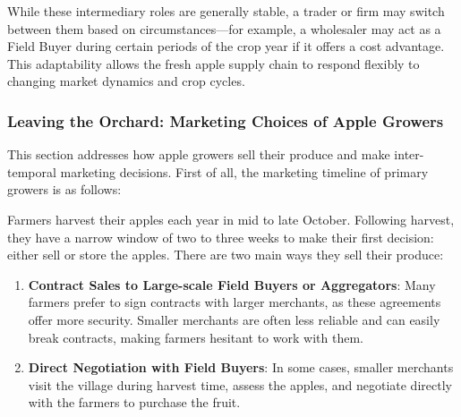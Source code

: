 While these intermediary roles are generally stable, a trader or firm may switch between them based on circumstances---for example, a wholesaler may act as a Field Buyer during certain periods of the crop year if it offers a cost advantage. This adaptability allows the fresh apple supply chain to respond flexibly to changing market dynamics and crop cycles.




\subsubsection{Leaving the Orchard: Marketing Choices of Apple Growers}
\noindent This section addresses how apple growers sell their produce and make inter-temporal marketing decisions. First of all, the marketing timeline of primary growers is as follows: 



Farmers harvest their apples each year in mid to late October. Following harvest, they have a narrow window of two to three weeks to make their first decision: either sell or store the apples. There are two main ways they sell their produce:

\begin{enumerate}
    \item \textbf{Contract Sales to Large-scale Field Buyers or Aggregators}: Many farmers prefer to sign contracts with larger merchants, as these agreements offer more security. Smaller merchants are often less reliable and can easily break contracts, making farmers hesitant to work with them.
    \item \textbf{Direct Negotiation with Field Buyers}: In some cases, smaller merchants visit the village during harvest time, assess the apples, and negotiate directly with the farmers to purchase the fruit.
\end{enumerate}

